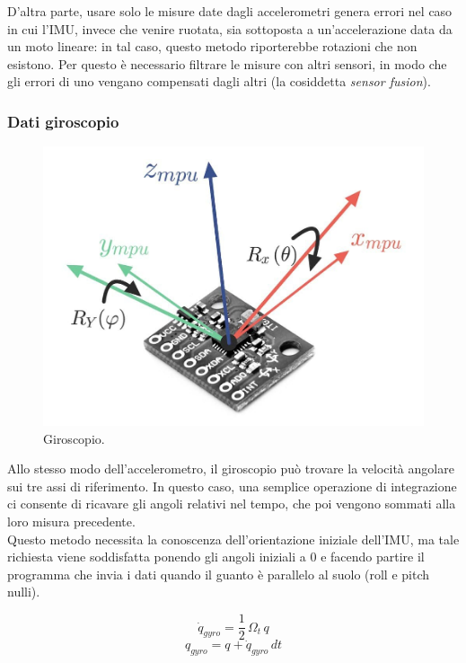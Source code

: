 D'altra parte, usare solo le misure date dagli accelerometri genera errori nel caso in cui l'IMU, invece che venire ruotata, sia sottoposta a un'accelerazione data da un moto lineare: in tal caso, questo metodo riporterebbe rotazioni che non esistono. Per questo è necessario filtrare le misure con altri sensori, in modo che gli errori di uno vengano compensati dagli altri (la cosiddetta \textit{sensor fusion}).

\clearpage

\subsubsection{Dati giroscopio}\label{Dati giroscopio}

\begin{figure}[H]
    \includegraphics[scale=0.25]{immagini/IMU_sdr_R.jpg}
    \centering
    \caption{Giroscopio.}
\end{figure}

Allo stesso modo dell'accelerometro, il giroscopio può trovare la velocità angolare sui tre assi di riferimento. In questo caso, una semplice operazione di integrazione ci consente di ricavare gli angoli relativi nel tempo, che poi vengono sommati alla loro misura precedente.\\
Questo metodo necessita la conoscenza dell'orientazione iniziale dell'IMU, ma tale richiesta viene soddisfatta ponendo gli angoli iniziali a 0 e facendo partire il programma che invia i dati quando il guanto è parallelo al suolo (roll e pitch nulli).

\begin{equation*}
    \dot{q}_{gyro} = \frac{1}{2} \, \Omega_t \, q
\end{equation*}
\begin{equation*}
	q_{gyro} = q + \dot{q}_{gyro} \, dt
\end{equation*}\label{integr gyro}

